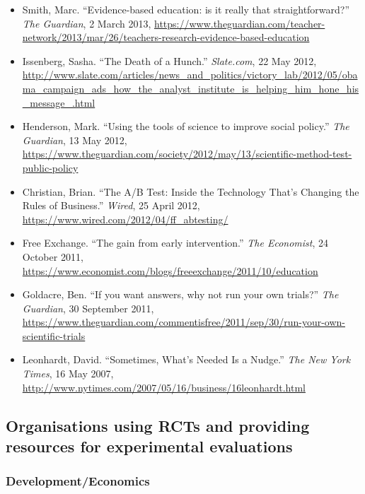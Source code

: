 \documentclass[12pt,a4paper]{article}
\begin{document}
\begin{itemize}
\item Smith, Marc. ``Evidence-based education: is it really that straightforward?'' \textit{The Guardian}, 2 March 2013, \url{https://www.theguardian.com/teacher-network/2013/mar/26/teachers-research-evidence-based-education}

\item Issenberg, Sasha. ``The Death of a Hunch.'' \textit{Slate.com}, 22 May 2012,  \url{http://www.slate.com/articles/news_and_politics/victory_lab/2012/05/obama_campaign_ads_how_the_analyst_institute_is_helping_him_hone_his_message_.html}

\item Henderson, Mark. ``Using the tools of science to improve social policy.'' \textit{The Guardian}, 13 May 2012, \url{https://www.theguardian.com/society/2012/may/13/scientific-method-test-public-policy}

\item Christian, Brian. ``The A/B Test: Inside the Technology That's Changing the Rules of Business.'' \textit{Wired}, 25 April 2012, \url{https://www.wired.com/2012/04/ff_abtesting/}

\item Free Exchange. ``The gain from early intervention.'' \textit{The Economist}, 24 October 2011, \url{https://www.economist.com/blogs/freeexchange/2011/10/education}

\item Goldacre, Ben. ``If you want answers, why not run your own trials?'' \textit{The Guardian}, 30 September 2011, \url{https://www.theguardian.com/commentisfree/2011/sep/30/run-your-own-scientific-trials}
\item Leonhardt, David. ``Sometimes, What's Needed Is a Nudge.'' \textit{The New York Times}, 16 May 2007, \url{http://www.nytimes.com/2007/05/16/business/16leonhardt.html}

\end{itemize}


\subsection*{Organisations using RCTs and providing resources for experimental evaluations}

\subsubsection*{Development/Economics}
\end{document}
